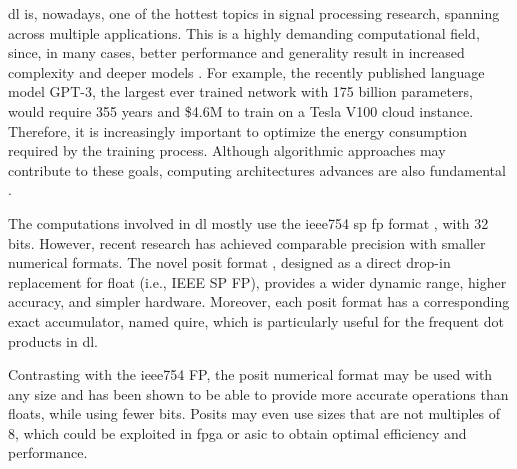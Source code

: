 \documentclass{article}
\begin{document}
	\gls{dl} is, nowadays, one of the hottest topics in signal processing research, spanning across multiple applications. This is a highly demanding computational field, since, in many cases, better performance and generality result in increased complexity and deeper models \cite{Thompson2020}. For example, the recently published language model GPT-3, the largest ever trained network with 175 billion parameters, would require 355 years and \$4.6M to train on a Tesla V100 cloud instance\cite{Li2020}. Therefore, it is increasingly important to optimize the energy consumption required by the training process. Although algorithmic approaches may contribute to these goals, computing architectures advances are also fundamental \cite{Schmidhuber2015}.
	
	The computations involved in \gls{dl} mostly use the \acrshort{ieee754} \gls{sp} \gls{fp} format \cite{IEEE2019}, with 32 bits. However, recent research has achieved comparable precision with smaller numerical formats. The novel posit format \cite{Gustafson2017}, designed as a direct drop-in replacement for float (i.e., IEEE SP FP), provides a wider dynamic range, higher accuracy, and simpler hardware. Moreover, each posit format has a corresponding exact accumulator, named quire, which is particularly useful for the frequent dot products in \gls{dl}.
	
	Contrasting with the \acrshort{ieee754} FP, the posit numerical format may be used with any size and has been shown to be able to provide more accurate operations than floats, while using fewer bits. Posits may even use sizes that are not multiples of 8, which could be exploited in \gls{fpga} or \gls{asic} to obtain optimal efficiency and performance.
	
	
\end{document}
